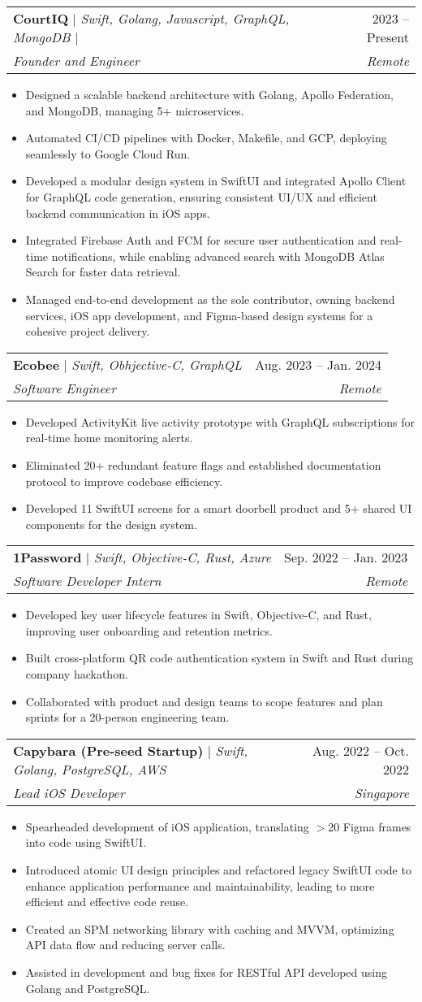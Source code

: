 \documentclass[letterpaper,11pt]{article}
\makeatletter
\newcommand{\resumeItem}[1]{
  \item\small{
    {#1 \vspace{-1pt}}  %
  }
}
\newcommand{\resumeSubheading}[4]{
  \vspace{-2pt}\item
    \begin{tabular*}{0.97\textwidth}[t]{l@{\extracolsep{\fill}}r}
      #1 & #2 \\  %
      \textit{\small#3} & \textit{\small #4} \\
    \end{tabular*}\vspace{-5pt}
}
\newcommand{\resumeItemListStart}{\begin{itemize}}
\newcommand{\resumeItemListEnd}{\end{itemize}\vspace{-5pt}}
\makeatother
\begin{document}
    \resumeSubheading
    {\textbf{CourtIQ} $|$ \emph{Swift, Golang, Javascript, GraphQL, MongoDB $|$ \href{https://github.com/CourtIQ/courtiq-ios}{\color{linkblue}\faGithub}
    }}{2023 -- Present}
    {Founder and Engineer}{Remote}
    \resumeItemListStart
    \resumeItem{Designed a scalable backend architecture with Golang, Apollo Federation, and MongoDB, managing 5+ microservices.}
    \resumeItem{Automated CI/CD pipelines with Docker, Makefile, and GCP, deploying seamlessly to Google Cloud Run.}
      \resumeItem{Developed a modular design system in SwiftUI and integrated Apollo Client for GraphQL code generation, ensuring consistent UI/UX and efficient backend communication in iOS apps.}      
      \resumeItem{Integrated Firebase Auth and FCM for secure user authentication and real-time notifications, while enabling advanced search with MongoDB Atlas Search for faster data retrieval.}
      \resumeItem{Managed end-to-end development as the sole contributor, owning backend services, iOS app development, and Figma-based design systems for a cohesive project delivery.}
    \resumeItemListEnd

    \resumeSubheading
      {\textbf{Ecobee} $|$ \emph{Swift, Obhjective-C, GraphQL}}{Aug. 2023 -- Jan. 2024}
      {Software Engineer}{Remote}
      \resumeItemListStart
      \resumeItem{Developed ActivityKit live activity prototype with GraphQL subscriptions for real-time home monitoring alerts.}
      \resumeItem{Eliminated 20+ redundant feature flags and established documentation protocol to improve codebase efficiency.}
      \resumeItem{Developed 11 SwiftUI screens for a smart doorbell product and 5+ shared UI components for the design system.}
    \resumeItemListEnd
      
    \resumeSubheading
      {\textbf{1Password} $|$ \emph{Swift, Objective-C, Rust, Azure}}{Sep. 2022 -- Jan. 2023}
      {Software Developer Intern}{Remote}
      \resumeItemListStart
      \resumeItem{Developed key user lifecycle features in Swift, Objective-C, and Rust, improving user onboarding and retention metrics.}
      \resumeItem{Built cross-platform QR code authentication system in Swift and Rust during company hackathon.}
      \resumeItem{Collaborated with product and design teams to scope features and plan sprints for a 20-person engineering team.}
    \resumeItemListEnd
    
    \resumeSubheading
      {\textbf{Capybara (Pre-seed Startup)} $|$ \emph{Swift, Golang, PostgreSQL, AWS}}{Aug. 2022 -- Oct. 2022}
      {Lead iOS Developer}{Singapore}
      \resumeItemListStart
        \resumeItem{Spearheaded development of iOS application, translating $>$20 Figma frames into code using SwiftUI.}
        \resumeItem{Introduced atomic UI design principles and refactored legacy SwiftUI code to enhance application performance and maintainability, leading to more efficient and effective code reuse.}
        \resumeItem{Created an SPM networking library with caching and MVVM, optimizing API data flow and reducing server calls.}
        \resumeItem{Assisted in development and bug fixes for RESTful API developed using Golang and PostgreSQL.}
      \resumeItemListEnd
\end{document}
